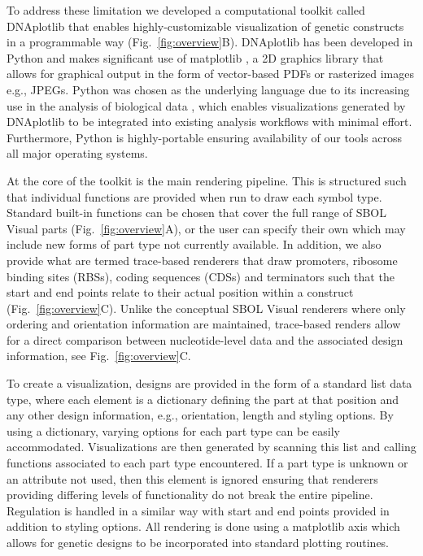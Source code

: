 \documentclass{bioinfo}
\begin{document}
To address these limitation we developed a computational toolkit called DNAplotlib that enables highly-customizable visualization of genetic constructs in a programmable way (Fig.~\ref{fig:overview}B). DNAplotlib has been developed in Python and makes significant use of matplotlib \citep{Hunter07a}, a 2D graphics library that allows for graphical output in the form of vector-based PDFs or rasterized images e.g., JPEGs. Python was chosen as the underlying language due to its increasing use in the analysis of biological data \citep{Cock09a}, which enables visualizations generated by DNAplotlib to be integrated into existing analysis workflows with minimal effort. Furthermore, Python is highly-portable ensuring availability of our tools across all major operating systems.

At the core of the toolkit is the main rendering pipeline. This is structured such that individual functions are provided when run to draw each symbol type. Standard built-in functions can be chosen that cover the full range of SBOL Visual parts (Fig.~\ref{fig:overview}A), or the user can specify their own which may include new forms of part type not currently available. In addition, we also provide what are termed trace-based renderers that draw promoters, ribosome binding sites (RBSs), coding sequences (CDSs) and terminators such that the start and end points relate to their actual position within a construct (Fig.~\ref{fig:overview}C). Unlike the conceptual SBOL Visual renderers where only ordering and orientation information are maintained, trace-based renders allow for a direct comparison between nucleotide-level data and the associated design information, see Fig.~\ref{fig:overview}C.

To create a visualization, designs are provided in the form of a standard list data type, where each element is a dictionary defining the part at that position and any other design information, e.g., orientation, length and styling options. By using a dictionary, varying options for each part type can be easily accommodated. Visualizations are then generated by scanning this list and calling functions associated to each part type encountered. If a part type is unknown or an attribute not used, then this element is ignored ensuring that renderers providing differing levels of functionality do not break the entire pipeline. Regulation is handled in a similar way with start and end points provided in addition to styling options. All rendering is done using a matplotlib axis which allows for genetic designs to be incorporated into standard plotting routines.
\end{document}
